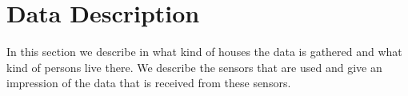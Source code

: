 \documentclass[a4paper,fleqn]{article}
\begin{document}
 



\pagebreak


\section{Data Description}
\label{sec:DataDesc}
In this section we describe in what kind of houses the data is gathered and what kind of persons live there. We describe the sensors that are used and give an impression of the data that is received from these sensors.
\end{document}
